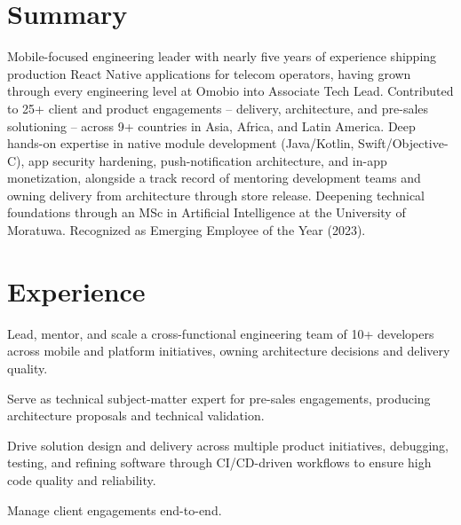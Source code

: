 \documentclass[10.5pt]{article}
\begin{document}

\section*{Summary}
Mobile-focused engineering leader with nearly five years of experience shipping production React Native applications for telecom operators, having grown through every engineering level at Omobio into Associate Tech Lead. Contributed to 25+ client and product engagements -- delivery, architecture, and pre-sales solutioning -- across 9+ countries in Asia, Africa, and Latin America. Deep hands-on expertise in native module development (Java/Kotlin, Swift/Objective-C), app security hardening, push-notification architecture, and in-app monetization, alongside a track record of mentoring development teams and owning delivery from architecture through store release. Deepening technical foundations through an MSc in Artificial Intelligence at the University of Moratuwa. Recognized as Emerging Employee of the Year (2023).

\section*{Experience}

\begin{cvitems}
  \item Lead, mentor, and scale a cross-functional engineering team of 10+ developers across mobile and platform initiatives, owning architecture decisions and delivery quality.
  \item Serve as technical subject-matter expert for pre-sales engagements, producing architecture proposals and technical validation.
  \item Drive solution design and delivery across multiple product initiatives, debugging, testing, and refining software through CI/CD-driven workflows to ensure high code quality and reliability.
  \item Manage client engagements end-to-end.
\end{cvitems}
\end{document}
